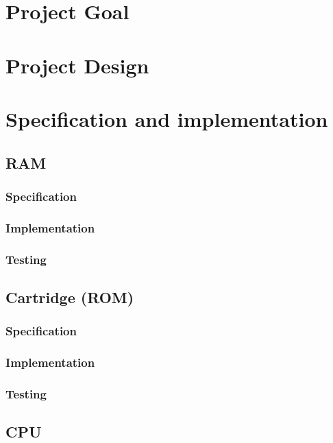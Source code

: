 \documentclass[]{report}
\begin{document}
\chapter{Project Goal}


\chapter{Project Design}

\chapter{Specification and implementation}

\section{RAM}

\subsection{Specification}

\subsection{Implementation}

\subsection{Testing}

\section{Cartridge (ROM)}

\subsection{Specification}

\subsection{Implementation}

\subsection{Testing}

\section{CPU}
\end{document}
